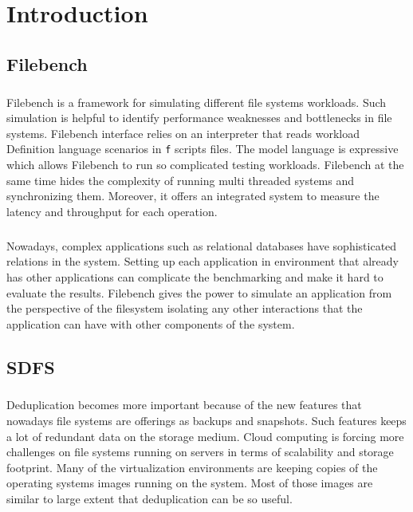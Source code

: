 \chapter{Introduction}\label{chap:intro}

\section{Filebench}
\paragraph{}
Filebench is a framework for simulating different file systems workloads. Such simulation is
helpful to identify performance weaknesses and bottlenecks in file systems. 
Filebench interface relies on an interpreter that reads workload Definition language scenarios in \verb+f+ scripts files.
The model language is expressive which allows Filebench to run so complicated
testing workloads. Filebench at the same time hides the complexity of running multi threaded systems and synchronizing them. Moreover, it offers
an integrated system to measure the latency and throughput for each operation\cite{web:fb-main}.

\paragraph{}
Nowadays, complex applications such as relational databases have sophisticated relations in the system. Setting up each 
application in environment that already has other applications can complicate the benchmarking 
and make it hard to evaluate the results. Filebench gives the power to simulate an application from the
perspective of the filesystem isolating any other interactions that the application can have with other
components of the system.


\section{SDFS}

\paragraph{}
Deduplication becomes more important because of the new features 
that nowadays file systems are offerings as backups and snapshots.
Such features keeps a lot of redundant data on the storage medium.
Cloud computing is forcing more challenges on file systems running
on servers in terms of scalability and storage footprint. Many
of the virtualization environments are keeping copies of the operating systems
images running on the system. Most of those images are similar to large extent
that deduplication can be so useful\cite{usenix}.

